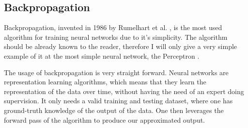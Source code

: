  \subsection{Backpropagation} \label{subsection::backpropagation}
  Backpropagation, invented in 1986 by Rumelhart et al. \cite{Rumelhart1986}, is the most used algorithm for training neural networks due to it's simplicity.
  The algorithm should be already known to the reader, therefore I will only give a very simple example of it at the most simple neural network, the Perceptron \cite{Rosenblatt1957}.
  \begin{center}
  \end{center}
  The usage of backpropagation is very straight forward. Neural networks are representation learning algorithms, which means that they learn the representation of the data over time, without
  having the need of an expert doing supervision. It only needs a valid training and testing dataset, where one has ground-truth knowledge of the output of the data. One then leverages the forward pass of the algorithm to produce our approximated output.
